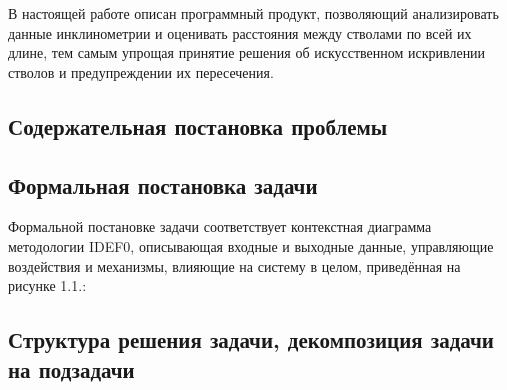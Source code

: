 В настоящей работе описан программный продукт, позволяющий анализировать данные инклинометрии и оценивать расстояния между стволами по всей их длине, тем
самым упрощая принятие решения об искусственном искривлении стволов и предупреждении их пересечения.




\subsection{Содержательная постановка проблемы}

\subsection{Формальная постановка задачи}
Формальной постановке задачи соответствует контекстная диаграмма методологии IDEF0, описывающая входные и выходные данные, управляющие воздействия и механизмы,
влияющие на систему в целом, приведённая на рисунке 1.1.:

\subsection{Структура решения задачи, декомпозиция задачи на подзадачи}
